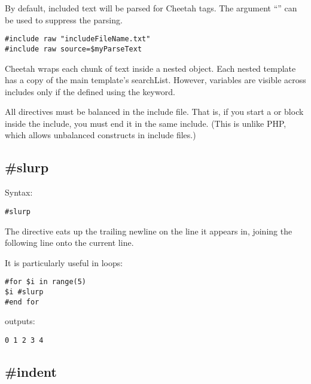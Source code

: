 By default, included text will be parsed for Cheetah tags.  The argument
``'' can be used to suppress the parsing.

\begin{verbatim}
#include raw "includeFileName.txt"
#include raw source=$myParseText
\end{verbatim}

Cheetah wraps each chunk of  text inside a nested
 object.  Each nested template has a copy of the main
template's searchList.  However,  variables are visible
across includes only if the defined using the  keyword.

All directives must be balanced in the include file.  That is, if you start
a  or  block inside the include, you must end it in
the same include.  (This is unlike PHP, which allows unbalanced constructs
in include files.)



\subsection{\#slurp}
\label{output.slurp}

Syntax:
\begin{verbatim}
#slurp
\end{verbatim}

The  directive eats up the trailing newline on the line it
appears in, joining the following line onto the current line.


It is particularly useful in  loops:
\begin{verbatim}
#for $i in range(5)
$i #slurp
#end for
\end{verbatim}
outputs:
\begin{verbatim}
0 1 2 3 4
\end{verbatim}


\subsection{\#indent}
\label{output.indent}

